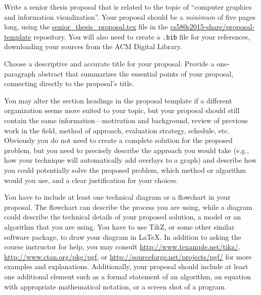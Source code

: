 

\usepackage{ulem}
\usepackage[compact]{titlesec}




Write a senior thesis proposal that is related to the topic of ``computer graphics and information visualization''.
Your proposal should be a {\em minimum} of five pages long, using the \url{senior_thesis_proposal.tex} file in the
\url{cs580s2015-share/proposal-template} repository.  You will also need to create a {\tt .bib} file for your
references, downloading your sources from the ACM Digital Library.

Choose a descriptive and accurate title for your proposal. Provide a one-paragraph abstract that summarizes the
essential points of your proposal, connecting directly to the proposal's title.

You may alter the section headings in the proposal template if a different organization seems more suited to your topic,
but your proposal should still contain the same information---motivation and background, review of previous work in the
field, method of approach, evaluation strategy, schedule, etc. Obviously you do not need to create a complete solution
for the proposed problem, but you need to precisely describe the approach you would take (e.g., how your technique will
automatically add overlays to a graph) and describe how you could potentially solve the proposed problem, which method
or algorithm would you use, and a clear justification for your choices.

You have to include at least one technical diagram or a flowchart in your proposal. The flowchart can
describe the process you are using, while a diagram could describe the technical details of your proposed solution, a
model or an algorithm that you are using. You have to use TikZ, or some other similar software package, to draw your
diagram in \LaTeX. In addition to asking the course instructor for help, you may consult
\url{http://www.texample.net/tikz/}, \url{http://www.ctan.org/pkg/pgf}, or \url{http://sourceforge.net/projects/pgf/}
for more examples and explanations. Additionally, your proposal should include at least one additional element such as
a formal statement of an algorithm, an equation with appropriate mathematical notation, or a screen shot of a program.

